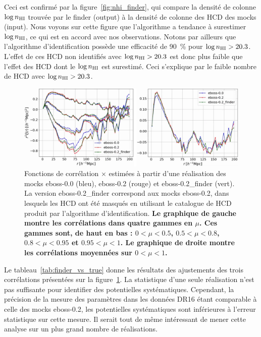 \documentclass[11pt, twoside, a4paper, openright]{report}
\begin{document}
Ceci est confirmé par la figure~\ref{fig:nhi_finder}, qui compare la densité de colonne $\log n_{\textsc{HI}}$ trouvée par le finder (output) à la densité de colonne des HCD des mocks (input). Nous voyons sur cette figure que l'algorithme a tendance à surestimer $\log n_{\textsc{HI}}$, ce qui est en accord avec nos observations.
Notons par ailleurs que l'algorithme d'identification possède une efficacité de \SI{90}{\percent} pour $\log n_{\textsc{HI}} > \num{20.3}$. L'effet de ces HCD non identifiés avec $\log n_{\textsc{HI}} > \num{20.3}$ est donc plus faible que l'effet des HCD dont le $\log n_{\textsc{HI}}$ est surestimé.
  Ceci s'explique par le faible nombre de HCD avec $\log n_{\textsc{HI}} > \num{20.3}$.


\begin{figure}
  \centering
  \includegraphics[scale=0.4]{cf_finder_vs_true}
  \caption{Fonctions de corrélation \lya{}$\times$\lya{} estimées à partir d'une réalisation des mocks eboss-0.0 (bleu), eboss-0.2 (rouge) et eboss-0.2\_finder (vert). La version eboss-0.2\_finder correspond aux mocks eboss-0.2, dans lesquels les HCD ont été masqués en utilisant le catalogue de HCD produit par l'algorithme d'identification.
    \textbf{Le graphique de gauche montre les corrélations dans quatre gammes en $\mu$. Ces gammes sont, de haut en bas : $\num{0} < \mu < \num{0.5}$, $\num{0.5} < \mu < \num{0.8}$, $\num{0.8} < \mu < \num{0.95}$ et $\num{0.95} < \mu < \num{1}$. Le graphique de droite montre les corrélations moyennées sur $\num{0}  < \mu < \num{1}$.}}
  \label{fig:cf_finder_vs_true}
\end{figure}

Le tableau~\ref{tab:finder_vs_true} donne les résultats des ajustements des trois corrélations présentées sur la figure~\ref{fig:cf_finder_vs_true}. La statistique d'une seule réalisation n'est pas suffisante pour identifier des potentielles systématiques. Cependant, la précision de la mesure des paramètres \lya{} dans les données DR16 étant comparable à celle des mocks eboss-0.2, les potentielles systématiques sont inférieures à l'erreur statistique sur cette mesure.
Il serait tout de même intéressant de mener cette analyse sur un plus grand nombre de réalisations.
\end{document}
